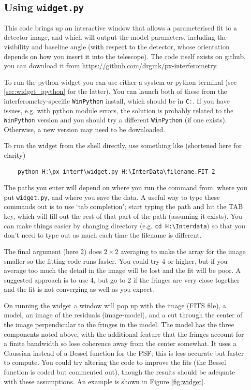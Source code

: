 \documentclass[11pt]{article}
\begin{document}
\subsection{Using \texttt{widget.py}}\label{sec:widget}

This code brings up an interactive window that allows a parameterised fit to a detector image, and which will output the model parameters, including the visibility and baseline angle (with respect to the detector, whose orientation depends on how you insert it into the telescope). The code itself exists on github, you can download it from
\href{https://github.com/drgmk/px-interferometry}{https://github.com/drgmk/px-interferometry}.

To run the python widget you can use either a system or python terminal (see \ref{sec:widget_ipython} for the latter). You can launch both of these from the interferometry-specific \texttt{WinPython} install, which should be in \texttt{C:}. If you have issues, e.g. with python module errors, the solution is probably related to the \texttt{WinPython} version and you should try a different \texttt{WinPython} (if one exists). Otherwise, a new version may need to be downloaded.

To run the widget from the shell directly, use something like (shortened here for clarity)
\begin{verbatim}
    python H:\px-interf\widget.py H:\InterData\filename.FIT 2
\end{verbatim}
The paths you enter will depend on where you run the command from, where you put \texttt{widget.py}, and where you save the data. A useful way to type these commands out is to use `tab completion'; start typing the path and hit the TAB key, which will fill out the rest of that part of the path (assuming it exists). You can make things easier by changing directory (e.g. \texttt{cd H:\textbackslash Interdata}) so that you don't need to type out as much each time the filename is different.

The final argument (here 2) does $2 \times 2$ averaging to make the array for the image smaller so the fitting code runs faster. You could try 4 or higher, but if you average too much the detail in the image will be lost and the fit will be poor. A suggested approach is to use 4, but go to 2 if the fringes are very close together and the fit is not converging as well as you expect.

On running the widget a window will pop up with the image (FITS file), a model, an image of the residuals (image-model), and a cut through the center of the image perpendicular to the fringes in the model. The model has the three components noted above, with the additional feature that the fringes account for a finite bandwidth so lose coherence away from the center somewhat. It uses a Gaussian instead of a Bessel function for the PSF; this is less accurate but faster to compute. You could try altering the code to improve the fits (the Bessel function is coded but commented out), though the results should be adequate with these assumptions. An example is shown in Figure \ref{fig:widget}.
\end{document}
